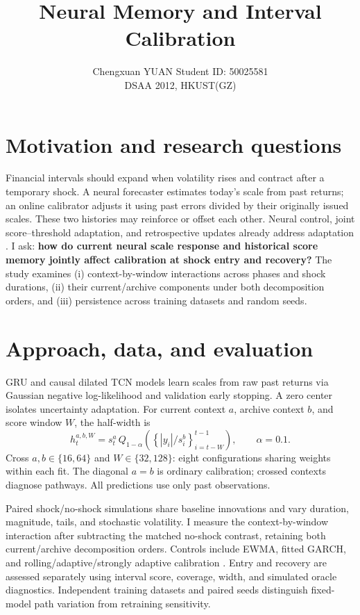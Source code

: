 \documentclass{article}
\title{Neural Memory and Interval Calibration}
\author{Chengxuan YUAN \quad Student ID: 50025581\\DSAA 2012, HKUST(GZ)}
\begin{document}
\maketitle

\section{Motivation and research questions}
Financial intervals should expand when volatility rises and contract after a
temporary shock. A neural forecaster estimates today's scale from past returns;
an online calibrator adjusts it using past errors divided by their originally
issued scales. These two histories may reinforce or offset each other.
Neural control, joint score--threshold adaptation, and retrospective updates
already address adaptation \citep{ncc,adapt,retro}. I ask:
\textbf{how do current neural scale response and historical score memory
jointly affect calibration at shock entry and recovery?}
The study examines (i) context-by-window interactions across phases and shock
durations, (ii) their current/archive components under both decomposition
orders, and (iii) persistence across training datasets and random seeds.

\section{Approach, data, and evaluation}
GRU and causal dilated TCN models learn scales from raw past returns via
Gaussian negative log-likelihood and validation early stopping. A zero center
isolates uncertainty adaptation. For current context $a$, archive context $b$,
and score window $W$, the half-width is
\[
 h_t^{a,b,W}=s_t^a\,
 Q_{1-\alpha}\!\left(\left\{|y_i|/s_i^b\right\}_{i=t-W}^{t-1}\right),
 \qquad \alpha=0.1.
\]
Cross $a,b\in\{16,64\}$ and $W\in\{32,128\}$: eight configurations sharing
weights within each fit. The diagonal $a=b$ is ordinary calibration; crossed
contexts diagnose pathways. All predictions use only past observations.

Paired shock/no-shock simulations share baseline innovations and vary duration,
magnitude, tails, and stochastic volatility. I measure the context-by-window
interaction after subtracting the matched no-shock contrast, retaining both
current/archive decomposition orders. Controls include EWMA, fitted GARCH, and
rolling/adaptive/strongly adaptive calibration \citep{saocp}. Entry and recovery
are assessed separately using interval score, coverage, width, and simulated
oracle diagnostics. Independent training datasets and paired seeds distinguish
fixed-model path variation from retraining sensitivity.
\end{document}
